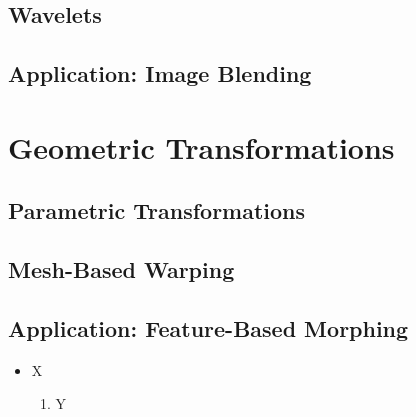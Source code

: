 \documentclass[12pt]{article}
\begin{document}
\subsection{Wavelets}

\subsection{Application: Image Blending}

\section{Geometric Transformations}

\subsection{Parametric Transformations}

\subsection{Mesh-Based Warping}

\subsection{Application: Feature-Based Morphing}



\begin{itemize}
    \item X
          \begin{enumerate}
              \item Y
          \end{enumerate}
\end{itemize}
\end{document}
